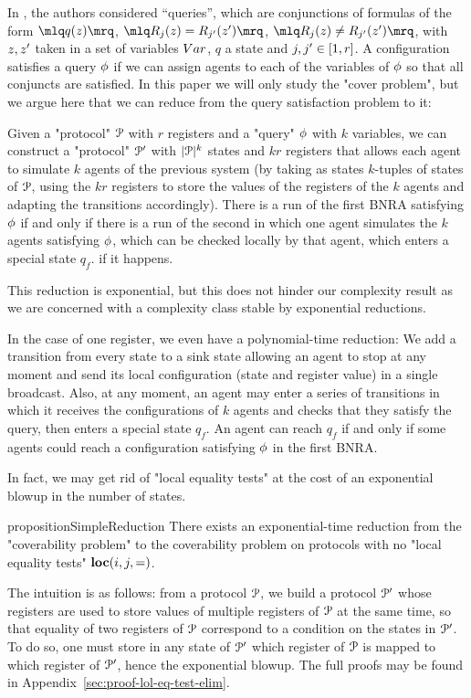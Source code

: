 \begin{remark}
	In \cite{DST2013}, the authors considered ``queries'', which are conjunctions of formulas of the form $\quotemarks{q(\var{z})}$, $\quotemarks{R_j(\var{z}) = R_{j'}(\var{z}')}$, $\quotemarks{R_j(\var{z}) \neq R_{j'}(\var{z}')}$, with $\var{z}, \var{z}'$ taken in a set of variables $\varset$, $q$ a state and $j,j' \in [1,r]$. A configuration satisfies a query $\phi$ if we can assign agents to each of the variables of $\phi$ so that all conjuncts are satisfied.
	In this paper we will only study the "cover problem", but we argue here that we can reduce from the query satisfaction problem to it:
	
	Given a "protocol" $\mathcal{P}$ with $r$ registers and a "query" $\phi$ with $k$ variables, we can construct a "protocol" $\mathcal{P}'$ with $|\mathcal{P}|^k$ states and $kr$ registers that allows each agent to simulate $k$ agents of the previous system (by taking as states $k$-tuples of states of $\mathcal{P}$, using the $kr$ registers to store the values of the registers of the $k$ agents and adapting the transitions accordingly).
	There is a run of the first BNRA satisfying $\phi$ if and only if there is a run of the second in which one agent simulates the $k$ agents satisfying $\phi$, which can be checked locally by that agent, which enters a special state $q_f$. if it happens. 
	
	This reduction is exponential, but this does not hinder our complexity result as we are concerned with a complexity class stable by exponential reductions.
	
	In the case of one register, we even have a polynomial-time reduction: We add a transition from every state to a sink state allowing an agent to stop at any moment and send its local configuration (state and register value) in a single broadcast.
	Also, at any moment, an agent may enter a series of transitions in which it receives the configurations of $k$ agents and checks that they satisfy the query, then enters a special state $q_f$. An agent can reach $q_f$ if and only if some agents could reach a configuration satisfying $\phi$ in the first BNRA.
\end{remark}

In fact, we may get rid of "local equality tests" at the cost of an exponential blowup in the number of states.

\begin{restatable}{proposition}{SimpleReduction}
	\label{prop:loc-eq-test-elimination}
	There exists an exponential-time reduction from the "coverability problem" to the coverability problem on protocols with no "local equality tests" $\textbf{loc}(i,j,=)$.
\end{restatable}
The intuition is as follows: from a protocol $\mathcal{P}$, we build a protocol $\mathcal{P}'$ whose registers are used to store values of multiple registers of $\mathcal{P}$ at the same time, so that equality of two registers of $\mathcal{P}$ correspond to a condition on the states in $\mathcal{P}'$. To do so, one must store in any state of $\mathcal{P}'$ which register of $\mathcal{P}$ is mapped to which register of $\mathcal{P}'$, hence the exponential blowup. The full proofs may be found in Appendix~\ref{sec:proof-lol-eq-test-elim}.
\ifbasic
